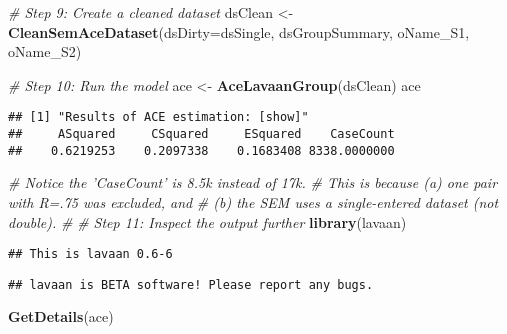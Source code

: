 \documentclass[smallextended]{svjour3}       %
\newenvironment{Shaded}{\begin{snugshade}}{\end{snugshade}}
\newcommand{\CommentTok}[1]{\textcolor[rgb]{0.56,0.35,0.01}{\textit{#1}}}
\newcommand{\DataTypeTok}[1]{\textcolor[rgb]{0.13,0.29,0.53}{#1}}
\newcommand{\KeywordTok}[1]{\textcolor[rgb]{0.13,0.29,0.53}{\textbf{#1}}}
\newcommand{\NormalTok}[1]{#1}
\newcommand{\StringTok}[1]{\textcolor[rgb]{0.31,0.60,0.02}{#1}}
\begin{document}
\begin{Shaded}
\begin{Highlighting}[]
\CommentTok{# Step 9: Create a cleaned dataset}
\NormalTok{dsClean <-}\StringTok{ }\KeywordTok{CleanSemAceDataset}\NormalTok{(}\DataTypeTok{dsDirty=}\NormalTok{dsSingle, dsGroupSummary, oName_S1, oName_S2)}

\CommentTok{# Step 10: Run the model}
\NormalTok{ace <-}\StringTok{ }\KeywordTok{AceLavaanGroup}\NormalTok{(dsClean)}
\NormalTok{ace}
\end{Highlighting}
\end{Shaded}

\begin{verbatim}
## [1] "Results of ACE estimation: [show]"
##     ASquared     CSquared     ESquared    CaseCount 
##    0.6219253    0.2097338    0.1683408 8338.0000000
\end{verbatim}

\begin{Shaded}
\begin{Highlighting}[]
\CommentTok{# Notice the 'CaseCount' is 8.5k instead of 17k.}
\CommentTok{#   This is because (a) one pair with R=.75 was excluded, and}
\CommentTok{#   (b) the SEM uses a single-entered dataset (not double).}
\CommentTok{#}
\CommentTok{# Step 11: Inspect the output further}
\KeywordTok{library}\NormalTok{(lavaan)}
\end{Highlighting}
\end{Shaded}

\begin{verbatim}
## This is lavaan 0.6-6
\end{verbatim}

\begin{verbatim}
## lavaan is BETA software! Please report any bugs.
\end{verbatim}

\begin{Shaded}
\begin{Highlighting}[]
\KeywordTok{GetDetails}\NormalTok{(ace)}
\end{Highlighting}
\end{Shaded}
\end{document}
